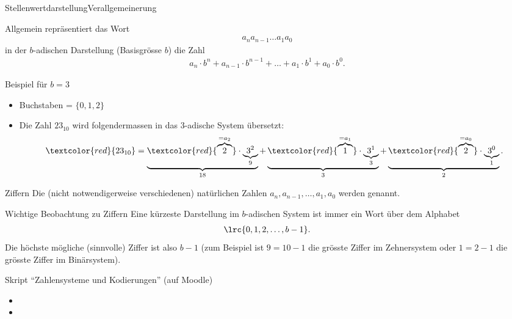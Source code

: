 \begin{frame}{Stellenwertdarstellung}{Verallgemeinerung}

Allgemein repräsentiert das Wort
    \begin{align*}
        a_na_{n-1}\ldots a_1a_0
    \end{align*}
    in der $b$-adischen Darstellung (Basisgrösse $b$) die Zahl
    \begin{align*}
        a_n\cdot b^n + a_{n-1}\cdot b^{n-1}+\ldots + a_1\cdot b^1 + a_0\cdot b^0.
    \end{align*}

    Beispiel für $b = 3$
    \begin{itemize}
        \item Buchstaben = $\{0,1,2\}$
        \item Die Zahl $23_{10}$ wird folgendermassen in das 3-adische System übersetzt:
        \begin{align*}
        \textcolor{red}{23_{10}}=\underbrace{\textcolor{red}{\overbrace{2}^{=a_2}}\cdot \underbrace{3^2}_{9}}_{18} + \underbrace{\textcolor{red}{\overbrace{1}^{=a_1}}\cdot \underbrace{3^1}_{3}}_{3} + \underbrace{\textcolor{red}{\overbrace{2}^{=a_0}}\cdot \underbrace{3^0}_{1}}_{2}.
    \end{align*}
    \end{itemize}
    
 \end{frame}

\begin{frame}{Ziffern}
Die (nicht notwendigerweise verschiedenen) natürlichen Zahlen $a_n,a_{n-1},\ldots,a_1,a_0$ werden  genannt.
\end{frame}

\begin{frame}{Wichtige Beobachtung zu Ziffern}
Eine kürzeste Darstellung im $b$-adischen System ist immer ein Wort über dem Alphabet
\begin{align*}
    \lrc{0,1,2,\ldots ,b-1}.
\end{align*}
Die höchste mögliche (sinnvolle) Ziffer ist also $b-1$ (zum Beispiel ist $9 = 10-1$ die grösste Ziffer im Zehnersystem oder $1 = 2-1$ die grösste Ziffer im Binärsystem).

\centering
\end{frame}

\begin{frame}{Skript \enquote{Zahlensysteme und Kodierungen} (auf Moodle)}
\begin{itemize}
    \item {}
    \item {}
\end{itemize}
\end{frame}

